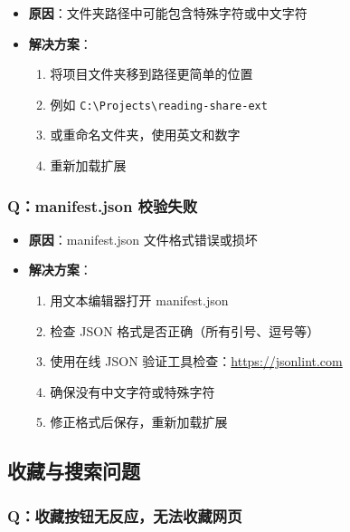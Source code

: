 \documentclass[10pt,a4paper]{article}
\begin{document}
\begin{itemize}
\begin{itemize}
\begin{itemize}
\begin{itemize}
  \item \textbf{原因}：文件夹路径中可能包含特殊字符或中文字符
  \item \textbf{解决方案}：
    \begin{enumerate}
      \item 将项目文件夹移到路径更简单的位置
      \item 例如 \texttt{C:\textbackslash Projects\textbackslash reading-share-ext}
      \item 或重命名文件夹，使用英文和数字
      \item 重新加载扩展
    \end{enumerate}
\end{itemize}

\subsubsection{Q：manifest.json 校验失败}

\begin{itemize}
  \item \textbf{原因}：manifest.json 文件格式错误或损坏
  \item \textbf{解决方案}：
    \begin{enumerate}
      \item 用文本编辑器打开 manifest.json
      \item 检查 JSON 格式是否正确（所有引号、逗号等）
      \item 使用在线 JSON 验证工具检查：\url{https://jsonlint.com}
      \item 确保没有中文字符或特殊字符
      \item 修正格式后保存，重新加载扩展
    \end{enumerate}
\end{itemize}

\subsection{收藏与搜索问题}

\subsubsection{Q：收藏按钮无反应，无法收藏网页}


\end{itemize}
\end{itemize}
\end{itemize}
\end{document}
